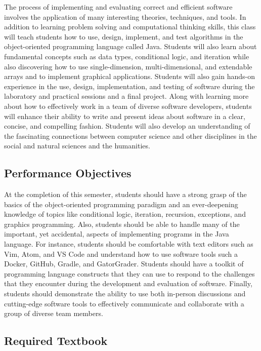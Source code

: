 \documentclass[11pt]{article}
\begin{document}
The process of implementing and evaluating correct and efficient software
involves the application of many interesting theories, techniques, and tools. In
addition to learning problem solving and computational thinking skills, this
class will teach students how to use, design, implement, and test algorithms in
the object-oriented programming language called Java. Students will also learn
about fundamental concepts such as data types, conditional logic, and iteration
while also discovering how to use single-dimension, multi-dimensional, and
extendable arrays and to implement graphical applications. Students will also
gain hands-on experience in the use, design, implementation, and testing of
software during the laboratory and practical sessions and a final project. Along
with learning more about how to effectively work in a team of diverse software
developers, students will enhance their ability to write and present ideas about
software in a clear, concise, and compelling fashion. Students will also develop
an understanding of the fascinating connections between computer science and
other disciplines in the social and natural sciences and the humanities.

\subsection*{Performance Objectives}

At the completion of this semester, students should have a strong grasp of the
basics of the object-oriented programming paradigm and an ever-deepening
knowledge of topics like conditional logic, iteration, recursion, exceptions,
and graphics programming. Also, students should be able to handle many of the
important, yet accidental, aspects of implementing programs in the Java
language. For instance, students should be comfortable with text editors such as
Vim, Atom, and VS Code and understand how to use software tools such a Docker,
GitHub, Gradle, and GatorGrader. Students should have a toolkit of programming
language constructs that they can use to respond to the challenges that they
encounter during the development and evaluation of software. Finally, students
should demonstrate the ability to use both in-person discussions and
cutting-edge software tools to effectively communicate and collaborate with a
group of diverse team members.

\vspace*{-.05in}

\subsection*{Required Textbook}
\end{document}
